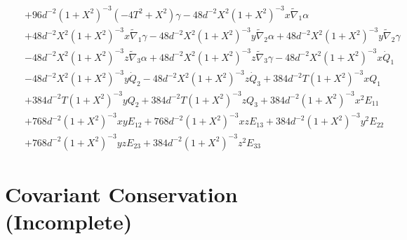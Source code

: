 \documentclass[10pt,letterpaper]{article}
\numberwithin{equation}{section}
\begin{document}
\begin{eqnarray}
&& + 96 d^{-2} (1 + X^2)^{-3} (-4 T^2 + X^2) \gamma - 48 d^{-2} X^2 (1 + X^2)^{-3} x \tilde{\nabla}_{1}\alpha \nonumber \\ 
&& + 48 d^{-2} X^2 (1 + X^2)^{-3} x \tilde{\nabla}_{1}\gamma - 48 d^{-2} X^2 (1 + X^2)^{-3} y \tilde{\nabla}_{2}\alpha + 48 d^{-2} X^2 (1 + X^2)^{-3} y \tilde{\nabla}_{2}\gamma \nonumber \\ 
&& - 48 d^{-2} X^2 (1 + X^2)^{-3} z \tilde{\nabla}_{3}\alpha + 48 d^{-2} X^2 (1 + X^2)^{-3} z \tilde{\nabla}_{3}\gamma -48 d^{-2} X^2 (1 + X^2)^{-3} x \dot{Q}_{1} \nonumber \\ 
&& - 48 d^{-2} X^2 (1 + X^2)^{-3} y \dot{Q}_{2} - 48 d^{-2} X^2 (1 + X^2)^{-3} z \dot{Q}_{3} + 384 d^{-2} T (1 + X^2)^{-3} x Q_{1} \nonumber \\ 
&& + 384 d^{-2} T (1 + X^2)^{-3} y Q_{2} + 384 d^{-2} T (1 + X^2)^{-3} z Q_{3}+384 d^{-2} (1 + X^2)^{-3} x^2 E_{11} \nonumber \\ 
&& + 768 d^{-2} (1 + X^2)^{-3} x y E_{12} + 768 d^{-2} (1 + X^2)^{-3} x z E_{13} + 384 d^{-2} (1 + X^2)^{-3} y^2 E_{22} \nonumber \\ 
&& + 768 d^{-2} (1 + X^2)^{-3} y z E_{23} + 384 d^{-2} (1 + X^2)^{-3} z^2 E_{33}
\end{eqnarray}
%
%
\section{Covariant Conservation (Incomplete)}
%
%
\end{document}

